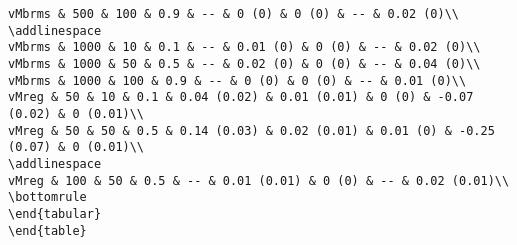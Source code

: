 \documentclass[
]{article}
\begin{document}
\begin{verbatim}
vMbrms & 500 & 100 & 0.9 & -- & 0 (0) & 0 (0) & -- & 0.02 (0)\\
\addlinespace
vMbrms & 1000 & 10 & 0.1 & -- & 0.01 (0) & 0 (0) & -- & 0.02 (0)\\
vMbrms & 1000 & 50 & 0.5 & -- & 0.02 (0) & 0 (0) & -- & 0.04 (0)\\
vMbrms & 1000 & 100 & 0.9 & -- & 0 (0) & 0 (0) & -- & 0.01 (0)\\
vMreg & 50 & 10 & 0.1 & 0.04 (0.02) & 0.01 (0.01) & 0 (0) & -0.07 (0.02) & 0 (0.01)\\
vMreg & 50 & 50 & 0.5 & 0.14 (0.03) & 0.02 (0.01) & 0.01 (0) & -0.25 (0.07) & 0 (0.01)\\
\addlinespace
vMreg & 100 & 50 & 0.5 & -- & 0.01 (0.01) & 0 (0) & -- & 0.02 (0.01)\\
\bottomrule
\end{tabular}
\end{table}
\end{verbatim}
\end{document}
